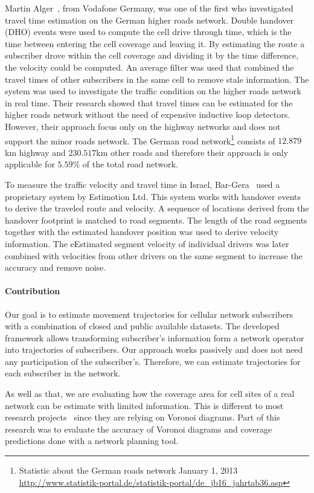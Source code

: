 Martin Alger~\cite{Alger2004}, from Vodafone Germany, was one of the first who investigated travel time estimation on the German higher roads network. Double handover (DHO) events were used to compute the cell drive through time, which is the time between entering the cell coverage and leaving it. By estimating the route a subscriber drove within the cell coverage and dividing it by the time difference, the velocity could be computed. An average filter was used that combined the travel times of other subscribers in the same cell to remove stale information. The system was used to investigate the traffic condition on the higher roads network in real time. Their research showed that travel times can be estimated for the higher roads network without the need of expensive inductive loop detectors. However, their approach focus only on the highway networks and does not support the minor roads network. The German road network\footnote{Statistic about the German roads network January 1, 2013 \url{http://www.statistik-portal.de/statistik-portal/de_jb16_jahrtab36.asp}} consists of $12.879$km highway and $230.517$km other roads and therefore their approach is only applicable for $5.59\%$ of the total road network.\newline

To measure the traffic velocity and travel time in Israel, Bar-Gera~\cite{Bar2007} used a proprietary system by Estimotion Ltd. This system works with handover events to derive the traveled route and velocity. A sequence of locations derived from the handover footprint is matched to road segments. The length of the road segments together with the estimated handover position was used to derive velocity information. The eEstimated segment velocity of individual drivers was later combined with velocities from other drivers on the same segment to increase the accuracy and remove noise.

\paragraph{Contribution}
Our goal is to estimate movement trajectories for cellular network subscribers with a combination of closed and public available datasets. The developed framework allows transforming subscriber's information form a network operator into trajectories of subscribers. Our approach works passively and does not need any participation of the subscriber's. Therefore, we can estimate trajectories for each subscriber in the network.

As well as that, we are evaluating how the coverage area for cell sites of a real network can be estimate with limited information. This is different to most research projects~\cite{Gonzalez2008,Tettamanti2012} since they are relying on Voronoi diagrams. Part of this research was to evaluate the accuracy of Voronoi diagrams and coverage predictions done with a network planning tool.

